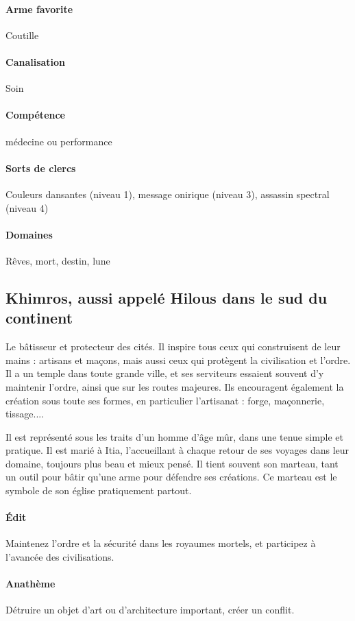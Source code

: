 \documentclass[10pt,a4paper]{book}
\begin{document}
\paragraph{Arme favorite } Coutille
\paragraph{Canalisation} Soin
\paragraph{Compétence}médecine ou performance
\paragraph{Sorts de clercs}Couleurs dansantes (niveau 1), message onirique (niveau 3), assassin spectral (niveau 4)
\paragraph{Domaines }Rêves, mort, destin, lune
\subsection{Khimros, aussi appelé Hilous dans le sud du continent}
Le bâtisseur et protecteur des cités. Il inspire tous ceux qui construisent de leur mains : artisans et maçons, mais aussi ceux qui protègent la civilisation et l'ordre. Il a un temple dans toute grande ville, et ses serviteurs essaient souvent d'y maintenir l'ordre, ainsi que sur les routes majeures. Ils encouragent également la création sous toute ses formes, en particulier l'artisanat : forge, maçonnerie, tissage....

Il est représenté sous les traits d'un homme d'âge mûr, dans une tenue simple et pratique. Il est marié à Itia, l'accueillant à chaque retour de ses voyages dans leur domaine, toujours plus beau et mieux pensé. Il tient souvent son marteau, tant un outil pour bâtir qu'une arme pour défendre ses créations. Ce marteau est le symbole de son église pratiquement partout.
\paragraph{Édit} Maintenez l'ordre et la sécurité dans les royaumes mortels, et participez à l'avancée des civilisations.
\paragraph{Anathème} Détruire un objet d'art ou d'architecture important, créer un conflit.
\end{document}

